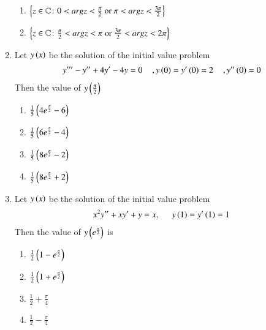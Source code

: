 \documentclass[journal,12pt,onecolumn]{IEEEtran}
\theoremstyle{remark}
\begin{document}
\begin{enumerate}
\begin{enumerate}
    \item $\left\{z \in \mathbb{C}\colon 0<arg z<\frac{\pi}{2} \text{ or } \pi < arg z < \frac{3\pi}{2}\right\}$
    \item $\left\{z \in \mathbb{C}\colon \frac{\pi}{2}<arg z<\pi \text{ or } \frac{3\pi}{2}< arg z < 2\pi\right\}$\\
\end{enumerate}
  \item Let $y\left(x\right)$ be the solution of the initial value problem 
  \begin{align}
      y^{\prime\prime\prime} -y^{\prime\prime} + 4y^\prime -4y =0 \hspace{0.4cm} ,y\left(0\right)=y^\prime \left(0\right) = 2  \hspace{0.4cm},  y^{\prime\prime}\left(0\right)=0
  \end{align}
  Then the value of $y\left(\frac{\pi}{2}\right)$
  \begin{multicols}{4}
  \begin{enumerate}
      \item $\frac{1}{5}\left(4e^{\frac{\pi}{2}}-6\right)$
            \item $\frac{1}{5}\left(6e^{\frac{\pi}{2}}-4\right)$
                  \item $\frac{1}{5}\left(8e^{\frac{\pi}{2}}-2\right)$
                        \item $\frac{1}{5}\left(8e^{\frac{\pi}{2}}+2\right)$\\
  \end{enumerate}
  \end{multicols}
  \item Let $y\left(x\right)$ be the solution of the initial value problem 
  \begin{align}
      x^2y^{\prime\prime} + x y^{\prime} + y = x , \hspace{0.5cm} y\left(1\right) = y^\prime \left(1\right) = 1
  \end{align}
  Then the value of $y\left(e^{\frac{\pi}{2}}\right)$ is
  \begin{multicols}{4}
      \begin{enumerate}
          \item $\frac{1}{2}\left(1 - e^{\frac{\pi}{2}}\right)$
           \item $\frac{1}{2}\left(1 + e^{\frac{\pi}{2}}\right)$
            \item $\frac{1}{2}+\frac{\pi}{4}$
             \item $\frac{1}{2} - \frac{\pi}{4}$\\
      \end{enumerate}
  \end{multicols}

\end{enumerate}
\end{document}
